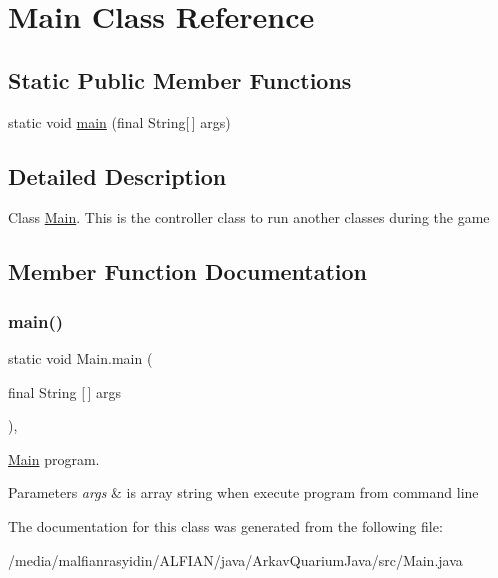 \hypertarget{class_main}{}\section{Main Class Reference}
\label{class_main}
\subsection*{Static Public Member Functions}
\begin{DoxyCompactItemize}
\item 
static void \mbox{\hyperlink{class_main_a1f077a378d17565d62958633da1a12b7}{main}} (final String\mbox{[}$\,$\mbox{]} args)
\end{DoxyCompactItemize}


\subsection{Detailed Description}
Class \mbox{\hyperlink{class_main}{Main}}. This is the controller class to run another classes during the game 

\subsection{Member Function Documentation}
\mbox{\label{class_main_a1f077a378d17565d62958633da1a12b7}} 
\subsubsection{\texorpdfstring{main()}{main()}}
{\footnotesize\ttfamily static void Main.\+main (\begin{DoxyParamCaption}\item[{final String \mbox{[}$\,$\mbox{]}}]{args }\end{DoxyParamCaption})\hspace{0.3cm}{\ttfamily [inline]}, {\ttfamily [static]}}

\mbox{\hyperlink{class_main}{Main}} program.


\begin{DoxyParams}{Parameters}
{\em args} & is array string when execute program from command line \\
\hline
\end{DoxyParams}


The documentation for this class was generated from the following file\+:\begin{DoxyCompactItemize}
\item 
/media/malfianrasyidin/\+A\+L\+F\+I\+A\+N/java/\+Arkav\+Quarium\+Java/src/Main.\+java\end{DoxyCompactItemize}
